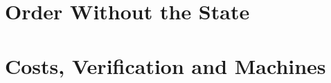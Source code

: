 \documentclass[11pt,openany,twoside]{book}
\begin{document}
\part{Order Without the State}


\part{Costs, Verification and Machines}













\appendix








\backmatter

\printindex
\end{document}
